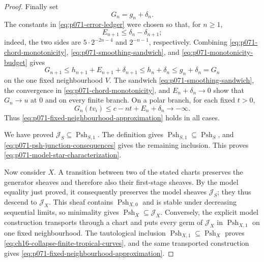 \begin{proof}
Finally set
\begin{equation}
\label{eq:p071-final-approximants}
                              G_n=g_n+\delta_n.
\end{equation}
The constants in \eqref{eq:p071-error-ledger} were chosen so that, for
$n\geq1$,
\begin{equation}
\label{eq:p071-monotonicity-budget}
 E_{n+1}\leq\delta_n-\delta_{n+1};
\end{equation}
indeed, the two sides are $5\cdot2^{-2n-4}$ and $2^{-n-1}$,
respectively.  Combining \eqref{eq:p071-chord-monotonicity},
\eqref{eq:p071-smoothing-sandwich}, and
\eqref{eq:p071-monotonicity-budget} gives
\[
 G_{n+1}
 \leq h_{n+1}+E_{n+1}+\delta_{n+1}
 \leq h_n+\delta_n
 \leq g_n+\delta_n
 =G_n
\]
on the one fixed neighbourhood $V$.  The sandwich
\eqref{eq:p071-smoothing-sandwich}, the convergence in
\eqref{eq:p071-chord-monotonicity}, and
$E_n+\delta_n\to0$ show that $G_n\to u$ at $0$ and on every finite
branch.  On a polar branch, for each fixed $t>0$,
\[
             G_n(tv_i)\leq c-nt+E_n+\delta_n\longrightarrow-\infty.
\]
Thus \eqref{eq:p071-fixed-neighbourhood-approximation} holds in all cases.

We have proved $\mathscr J_S\subseteq\operatorname{Psh}_{S,1}$.  The
definition gives
$\operatorname{Psh}_{S,1}\subseteq\operatorname{Psh}_S$, and
\eqref{eq:p071-psh-junction-consequences} gives the remaining inclusion.
This proves \eqref{eq:p071-model-star-characterization}.

Now consider $X$.  A transition between two of the stated charts preserves
the generator sheaves and therefore also their first-stage sheaves.  By the
model equality just proved, it consequently preserves the model sheaves
$\mathscr J_S$; they thus descend to $\mathscr J_X$.  This sheaf contains
$\operatorname{Psh}_{X,0}$ and is stable under decreasing sequential
limits, so minimality gives
$\operatorname{Psh}_X\subseteq\mathscr J_X$.  Conversely, the explicit
model construction transports through a chart and puts every germ of
$\mathscr J_X$ in $\operatorname{Psh}_{X,1}$ on one fixed neighbourhood.
The tautological inclusion
$\operatorname{Psh}_{X,1}\subseteq\operatorname{Psh}_X$ proves
\eqref{eq:ch16-collapse-finite-tropical-curves}, and the same transported
construction gives \eqref{eq:p071-fixed-neighbourhood-approximation}.
\end{proof}
